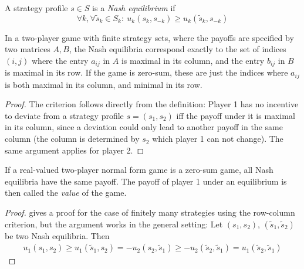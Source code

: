 \documentclass[a4paper]{scrreprt}
\begin{document}
    \begin{defn}
        A strategy profile $s \in S$ is a \emph{Nash equilibrium} if
        \[
            \forall k, \forall \tilde{s}_k \in S_k:~ u_k(s_k, s_{-k}) \geq u_k(\tilde{s}_k, s_{-k})
        \]
        \label{def:nashEquilibriumRealValued}
    \end{defn}
    
    \begin{lemma}
        In a two-player game with finite strategy sets, where the payoffs are specified by two matrices $A, B$, the Nash equilibria correspond
        exactly to the set of indices $(i, j)$ where the entry $a_{ij}$ in $A$ is maximal in its column, and the entry $b_{ij}$ in $B$ is maximal in its row.
        If the game is zero-sum, these are just the indices where $a_{ij}$ is both maximal in its column, and minimal in its row.
    \end{lemma}
    \begin{proof}
        The criterion follows directly from the definition: 
        Player 1 has no incentive to deviate from a strategy profile $s = (s_1, s_2)$ iff the payoff under it is maximal in its column, since a deviation could only lead to another payoff in the same column (the column is determined by $s_2$ which player 1 can not change). The same argument applies for player 2.
    \end{proof}


    \begin{lemma}
        If a real-valued two-player normal form game is a zero-sum game, all Nash equilibria have the same payoff.
        The payoff of player 1 under an equilibrium is then called the \emph{value} of the game.
    \end{lemma}
    \begin{proof}
        \cite[p.15]{bib:matsumotoGameTheory} gives a proof for the case of finitely many strategies using the row-column criterion, but the argument works in the general setting:
        Let $(s_1, s_2)$, $(\tilde{s}_1, \tilde{s}_2)$ be two Nash equilibria.
        Then
        \begin{gather*}
            u_1(s_1, s_2) \geq u_1(\tilde{s}_1, s_2) = -u_2(s_2, \tilde{s}_1) \geq -u_2(\tilde{s}_2, \tilde{s}_1) = u_1(\tilde{s}_2, \tilde{s}_1)
        \end{gather*}      
    \end{proof}
    
\end{document}

